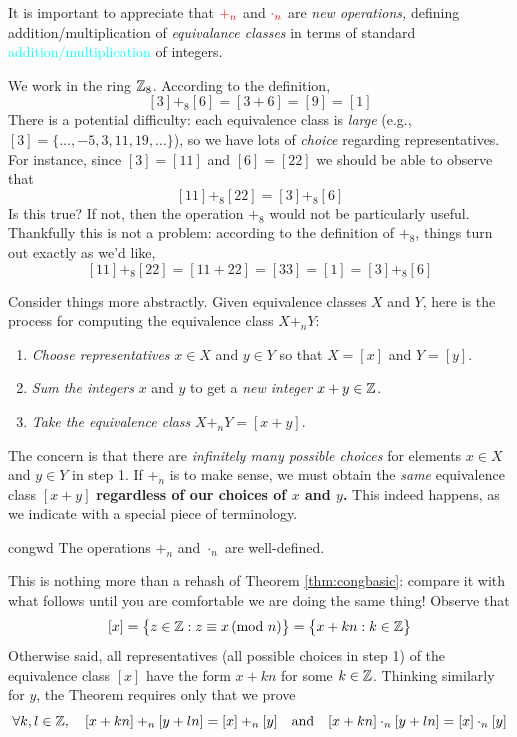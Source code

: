 It is important to appreciate that $\textcolor{red}{+_n}$ and $\textcolor{red}{\cdot_n}$ are \emph{new operations,} defining addition/multiplication of \emph{equivalance classes} in terms of standard \textcolor{cyan}{addition/multiplication} of integers.

\begin{example}{}{}
	We work in the ring $\mathbb{Z}_8$. According to the definition,
	\[
		[3]+_8[6]=[3+6]=[9]=[1]
	\]
	There is a potential difficulty: each equivalence class is \emph{large} (e.g., $[3]=\{\ldots,-5,3,11,19,\ldots\}$), so we have lots of \emph{choice} regarding representatives. For instance, since $[3]=[11]$ and $[6]=[22]$ we should be able to observe that
	\[
		[11]+_8[22] =[3]+_8[6]
	\]
	Is this true? If not, then the operation $+_8$ would not be particularly useful. Thankfully this is not a problem: according to the definition of $+_8$, things turn out exactly as we'd like,
	\[
		[11]+_8[22]=[11+22]=[33]=[1] =[3]+_8[6]
	\]
\end{example}


\goodbreak


Consider things more abstractly. Given equivalence classes $X$ and $Y$, here is the process for computing the equivalence class $X+_nY$:
\begin{enumerate}
  \item \emph{Choose representatives} $x\in X$ and $y\in Y$ so that $X=[x]$ and $Y=[y]$.
  \item \emph{Sum the integers} $x$ and $y$ to get a \emph{new integer} $x+y\in\mathbb{Z}$.
  \item \emph{Take the equivalence class} $X+_nY=[x+y]$.
\end{enumerate}
The concern is that there are \emph{infinitely many possible choices} for elements $x\in X$ and $y\in Y$ in step 1. If $+_n$ is to make sense, we must obtain the \emph{same} equivalence class $[x+y]$ {\bf regardless of our choices of $x$ and $y$.} This indeed happens, as we indicate with a special piece of terminology.


% 


\begin{thm}{}{congwd}
	The operations $+_n$ and $\cdot_n$ are well-defined.
\end{thm}

This is nothing more than a rehash of Theorem \ref{thm:congbasic}: compare it with what follows until you are comfortable we are doing the same thing! Observe that
\[
	[x]=\bigl\{z\in\mathbb{Z}:z\equiv x\negthickspace\pmod{n}\bigr\} =\bigl\{x+kn:k\in\mathbb{Z}\bigr\}
\]
Otherwise said, all representatives (all possible choices in step 1) of the equivalence class $[x]$ have the form $x+kn$ for some $k\in\mathbb{Z}$. Thinking similarly for $y$, the Theorem requires only that we prove
\[
	\forall k,l\in\mathbb{Z},\quad [x+kn]+_n[y+ln]=[x]+_n[y]\quad\text{and}\quad [x+kn]\cdot_n[y+ln]=[x]\cdot_n[y]
\]

